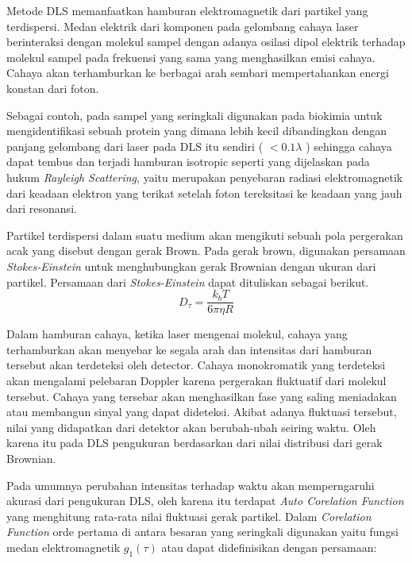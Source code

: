 Metode DLS memanfaatkan hamburan elektromagnetik dari partikel yang terdispersi. Medan elektrik
dari komponen pada gelombang cahaya laser berinteraksi dengan molekul sampel dengan adanya osilasi
dipol elektrik terhadap molekul sampel pada frekuensi yang sama yang menghasilkan emisi cahaya.
Cahaya akan terhamburkan ke berbagai arah sembari mempertahankan energi konstan dari foton. 

Sebagai contoh, pada sampel yang seringkali digunakan pada biokimia untuk mengidentifikasi sebuah
protein yang dimana lebih kecil dibandingkan dengan panjang gelombang dari laser pada DLS itu
sendiri ( $<0.1\lambda$ ) sehingga cahaya dapat tembus dan terjadi hamburan isotropic seperti yang
dijelaskan pada hukum \textit{Rayleigh Scattering}, yaitu merupakan penyebaran radiasi
elektromagnetik dari keadaan elektron yang terikat setelah foton tereksitasi ke keadaan yang jauh
dari resonansi\cite{Piazza2005}.

Partikel terdispersi dalam suatu medium akan mengikuti sebuah pola pergerakan acak yang disebut
dengan gerak Brown. Pada gerak brown, digunakan persamaan \textit{Stokes-Einstein} untuk
menghubungkan gerak Brownian dengan ukuran dari partikel\cite{Anindya2018}. Persamaan dari
\textit{Stokes-Einstein} dapat dituliskan sebagai berikut.
\begin{equation}
    D_{\tau} = \frac{k_b T}{6 \pi \eta R}
    \label{eq:stokeseinstein}
\end{equation}

Dalam hamburan cahaya, ketika laser mengenai molekul, cahaya yang terhamburkan akan menyebar ke
segala arah dan intensitas dari hamburan tersebut akan terdeteksi oleh detector. Cahaya monokromatik
yang terdeteksi akan mengalami pelebaran Doppler karena pergerakan fluktuatif dari molekul tersebut.
Cahaya yang tersebar akan menghasilkan fase yang saling meniadakan atau membangun sinyal yang dapat
dideteksi. Akibat adanya fluktuasi tersebut, nilai yang didapatkan dari detektor akan berubah-ubah
seiring waktu. Oleh karena itu pada DLS pengukuran berdasarkan dari nilai distribusi dari gerak
Brownian\cite{Falke2019,PavanM.V.Raja2022}. 

Pada umumnya perubahan intensitas terhadap waktu akan memperngaruhi akurasi dari pengukuran DLS,
oleh karena itu terdapat \textit{Auto Corelation Function} yang menghitung rata-rata nilai
fluktuasi gerak partikel. Dalam \textit{Corelation Function} orde pertama di antara besaran
yang seringkali digunakan yaitu fungsi medan elektromagnetik ${g_1 (\tau)}$ atau dapat
didefinisikan dengan persamaan:

